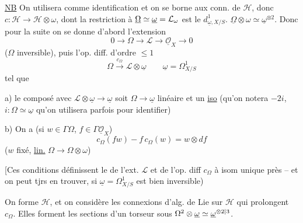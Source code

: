 \uline{NB} On utilisera  comme identification et on se borne aux conn. de $\mathcal{H}$, donc $c:\mathcal{H}\longrightarrow\mathcal{H}\otimes\omega$, dont la restriction à $\underline{\Omega}\simeq\underline{\omega}={\mathcal{L}_{\omega}}$ est le $d^1_{\underline{\omega},X/S}$.
    $\underline{\Omega}\otimes\omega\simeq\underline{\omega}^{\otimes2}$.
Donc pour la suite on se donne d'abord l'extension
\[
0\longrightarrow\Omega\longrightarrow\mathcal{L}\longrightarrow\underline{\mathcal{O}}_X\longrightarrow0
\]
($\Omega$ inversible), puis l'op. diff. d'ordre $\leq1$
\[
\Omega\xrightarrow{c_\Omega}\mathcal{L}\otimes\underline{\omega}\qquad\underline{\omega}=\Omega^1_{X/S}
\]
tel que

a) le composé avec $\mathcal{L}\otimes\underline{\omega}\longrightarrow\underline{\omega}$ soit  $\Omega\longrightarrow\underline{\omega}$ linéaire et un \uline{iso} (qu'on notera $-2i$, $i:\Omega\simeq\underline{\omega}$ qu'on utilisera parfois pour identifier)

b)  On a (si $w\in\Gamma\Omega$, $f\in\Gamma\underline{\mathcal{O}}_X$)
\[
c_\Omega(fw)-f\,c_\Omega(w)=w\otimes df
\]
($w$ fixé,  \uline{lin.} $\Omega\longrightarrow\Omega\otimes\omega$)

[Ces conditions définissent le  de l'ext. $\mathcal{L}$ et de l'op. diff $c_\Omega$ à isom unique près -- et on peut tjrs en trouver, si $\underline{\omega}=\Omega^1_{X/S}$ est bien inversible)

On forme $\mathcal{H}$, et on considère les connexions  d'alg. de Lie  sur $\mathcal{H}$ qui prolongent $c_\Omega$. Elles forment les sections d'un torseur sous ${\Omega^2}\otimes\underline{\omega}\simeq\underline{\omega}^{\otimes{2|3}}$. 


